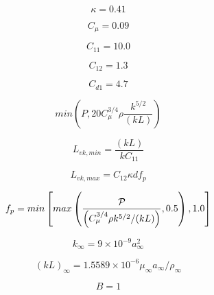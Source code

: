 \begin{equation}
\kappa = 0.41
\end{equation}

\begin{equation}
C_{\mu} = 0.09
\end{equation}

\begin{equation}
C_{11} = 10.0
\end{equation}

\begin{equation}
C_{12} = 1.3
\end{equation}

\begin{equation}
C_{d1} = 4.7
\end{equation}

\begin{equation}
min\left(P, 20 C_{\mu}^{3/4}\rho \frac{k^{5/2}}{(kL)}\right)
\end{equation}

\begin{equation}
L_{vk,min}=\frac{(kL)}{k C_{11}}
\end{equation}

\begin{equation}
L_{vk,max}=C_{12} \kappa d f_p
\end{equation}

\begin{equation}
f_p=min\left[ max\left(\frac{\cal P}{\left(C_{\mu}^{3/4} \rho k^{5/2}/(kL) \right)}
 , 0.5 \right) , 1.0 \right]
\end{equation}

\begin{equation}
k_{\infty} = 9 \times 10^{-9} a_{\infty}^2
\end{equation}

\begin{equation}
(kL)_{\infty} = 1.5589 \times 10^{-6} \mu_{\infty}a_{\infty}/\rho_{\infty}
\end{equation}

\begin{equation}
B=1
\end{equation}


